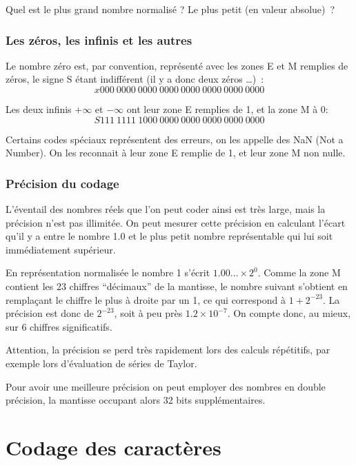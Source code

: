 \begin{exercice}{} Quel est le plus grand nombre normalis\'e ? Le plus petit 
(en valeur absolue)~?
\end{exercice}

\subsubsection{Les z\'eros, les infinis et les autres}

Le nombre z\'ero est, par convention, repr\'esent\'e avec les zones E
et M remplies de zéros, le signe S \'etant indiff\'erent (il y a donc
deux z\'eros \ldots)~:
$$ x000\ 0000\ 0000\ 0000\ 0000\ 0000\ 0000\ 0000 $$

Les deux infinis $+\infty$ et  $-\infty$ ont leur zone E remplies de 1, 
et la zone M \`a 0:
$$ S111\ 1111\ 1000\ 0000\ 0000\ 0000\ 0000\ 0000 $$

Certains codes sp\'eciaux repr\'esentent des erreurs, on les appelle des NaN 
(Not a Number). On les
reconnait \`a leur zone E remplie de 1, et leur zone M non nulle.

\subsubsection{Pr\'ecision du codage}

L'\'eventail des nombres r\'eels que l'on peut coder ainsi est tr\`es large, 
mais la pr\'ecision n'est pas illimit\'ee. On peut mesurer cette pr\'ecision
en calculant l'\'ecart qu'il y a entre le nombre 1.0 et le plus petit
nombre repr\'esentable qui lui soit imm\'ediatement sup\'erieur.

En repr\'esentation normalis\'ee le nombre 1 s'\'ecrit 
$1.00\ldots \times 2^0$. Comme la zone M contient les 23 chiffres
``d\'ecimaux'' de la mantisse, le nombre suivant s'obtient en rempla\c{c}ant
le chiffre le plus \`a droite par un 1, ce qui correspond \`a $1+ 2^{-23}$.
La pr\'ecision est donc de $2^{-23}$, 
soit \`a peu pr\`es $1.2 \times 10^{-7}$. On compte donc, au mieux, sur 6
chiffres significatifs.

Attention, la pr\'ecision se perd tr\`es rapidement lors des calculs r\'ep\'etitifs,
par exemple lors d'\'evaluation de s\'eries de Taylor.

Pour avoir une meilleure pr\'ecision on peut employer des nombres en double
pr\'ecision, la mantisse occupant alors 32 bits suppl\'ementaires.

\section{Codage des caract\`eres}

